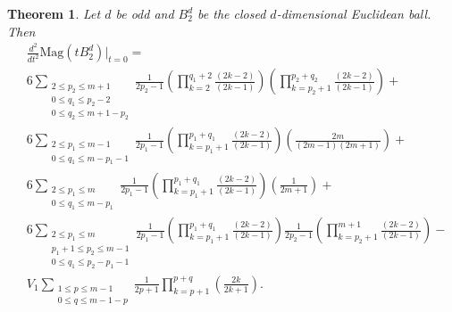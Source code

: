 \documentclass[11pt]{article}
\theoremstyle{mythm}
\newtheorem{theo}[defn]{Theorem}
\begin{document}
\begin{theo}\label{theo:partialres}
Let $d$ be odd and $B_2^d$ be the closed $d$-dimensional Euclidean ball. Then
\begin{equation}
\begin{aligned}
&\frac{d^2}{dt^2}\text{Mag}(tB_2^d)\big\vert_{t=0} = \\
&6\sum\limits_{\substack{2\leq p_2\leq m+1 \\ 0\leq q_1 \leq p_2-2 \\ 0\leq q_2 \leq m+1-p_2}}\frac{1}{2p_2-1}\left(\prod\limits_{k=2}^{q_1+2}\frac{(2k-2)}{(2k-1)}\right)\left(\prod\limits_{k=p_2+1}^{p_2+q_2}\frac{(2k-2)}{(2k-1)}\right) + \\
&6\sum\limits_{\substack{2\leq p_1\leq m-1 \\ 0\leq q_1\leq m-p_1-1}}\frac{1}{2p_1-1}\left(\prod\limits_{k=p_1+1}^{p_1+q_1}\frac{(2k-2)}{(2k-1)}\right)\left(\frac{2m}{(2m-1)(2m+1)}\right) + \\
&6\sum\limits_{\substack{2\leq p_1\leq m \\ 0\leq q_1\leq m-p_1}}\frac{1}{2p_1-1}\left(\prod\limits_{k=p_1+1}^{p_1+q_1}\frac{(2k-2)}{(2k-1)}\right)\left(\frac{1}{2m+1}\right) + \\
&6\sum\limits_{\substack{2\leq p_1\leq m \\ p_1+1\leq p_2 \leq m-1 \\ 0\leq q_1\leq p_2-p_1-1 }}\frac{1}{2p_1-1}\left(\prod\limits_{k=p_1+1}^{p_1+q_1}\frac{(2k-2)}{(2k-1)}\right)\frac{1}{2p_2-1}\left(\prod\limits_{k=p_2+1}^{m+1}\frac{(2k-2)}{(2k-1)}\right) - \\
&V_{1}\sum\limits_{\substack{1\leq p \leq m-1 \\ 0 \leq q \leq m - 1 - p}}\frac{1}{2p+1}\prod\limits_{k=p+1}^{p+q}\left(\frac{2k}{2k+1}\right).
\end{aligned}
\end{equation}
\end{theo}
\end{document}
